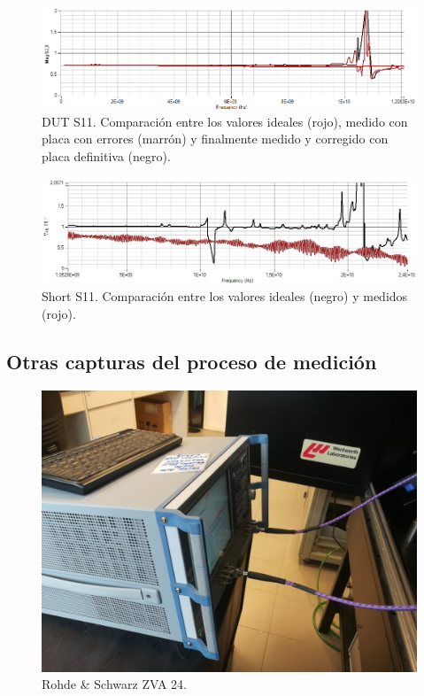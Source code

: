\documentclass[10pt, a4paper, twocolumn]{article}
\begin{document}
\begin{figure}[hbt!]
	\includegraphics[width=\linewidth]{Fotos/Mediciones/DUT_S21.PNG}
	\caption{DUT S11. Comparación entre los valores ideales (rojo), medido con placa con errores (marrón)
	y finalmente medido y corregido con placa definitiva (negro).}
\end{figure}

\begin{figure}[hbt!]
	\includegraphics[width=\linewidth]{Fotos/Mediciones/Short_S11.jpeg}
	\caption{Short S11. Comparación entre los valores ideales (negro) y medidos (rojo).}
\end{figure}

\clearpage

\subsection{Otras capturas del proceso de medición}

\begin{figure}[hbt!]
	\includegraphics[width=\linewidth]{Fotos/Med_1.jpeg}
	\caption{Rohde \& Schwarz ZVA 24.}
\end{figure}
\end{document}
